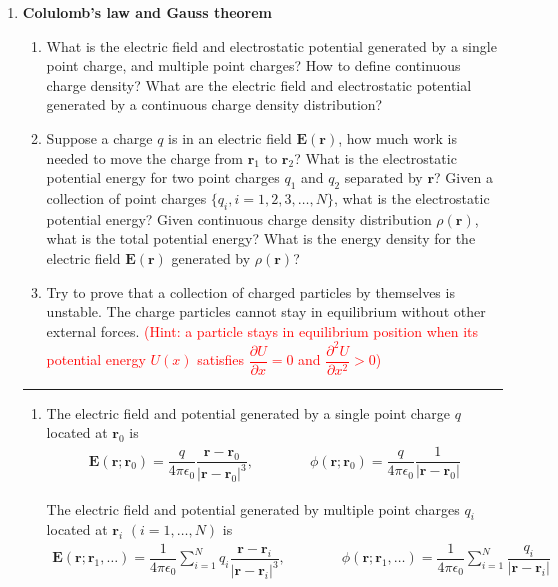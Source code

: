 \documentclass[a4paper,11pt]{article}
\begin{document}
\begin{enumerate}
    \item \textbf{Colulomb's law and Gauss theorem}
    \begin{enumerate}
        \item What is the electric field and electrostatic potential generated by a single point charge, and multiple point charges? How to define continuous charge density? What are the electric field and electrostatic potential generated by a continuous charge density distribution?
        \item Suppose a charge $q$ is in an electric field $\boldsymbol{E}(\boldsymbol{r})$, how much work is needed to move the charge from $\boldsymbol{r}_1$ to $\boldsymbol{r}_2$? What is the electrostatic potential energy for two point charges $q_1$ and $q_2$ separated by $\boldsymbol{r}$? Given a collection of point charges $\{q_i,i=1,2,3,\dots,N\}$, what is the electrostatic potential energy? Given continuous charge density distribution $\rho(\boldsymbol{r})$, what is the total potential energy? What is the energy density for the electric field $\boldsymbol{E}(\boldsymbol{r})$ generated by $\rho(\boldsymbol{r})$?
        \item Try to prove that a collection of charged particles by themselves is unstable. The charge particles cannot stay in equilibrium without other external forces. \textcolor{red}{(Hint: a particle stays in equilibrium position when its potential energy $U(x)$ satisfies $\dfrac{\partial U}{\partial x}= 0$ and $\dfrac{\partial^2 U}{\partial x^2}>0$)}
    \end{enumerate}
    \rule[0pt]{6cm}{0.05em}
    \begin{enumerate}
        \item The electric field and potential generated by a single point charge $q$ located at $\boldsymbol{r}_0$ is 
        \begin{eqnarray}
            \boldsymbol{E}(\boldsymbol{r};\boldsymbol{r}_0)=\dfrac{q}{4\pi\epsilon_0}\dfrac{\boldsymbol{r}-\boldsymbol{r}_0}{|\boldsymbol{r}-\boldsymbol{r}_0|^3},\quad\quad\quad\quad \phi(\boldsymbol{r};\boldsymbol{r}_0)=\dfrac{q}{4\pi\epsilon_0}\dfrac{1}{|\boldsymbol{r}-\boldsymbol{r}_0|}
        \end{eqnarray}

        The electric field and potential generated by multiple point charges $q_i$ located at $\boldsymbol{r}_i$ $(i=1,\dots,N)$ is 
        \begin{eqnarray}\label{eq1}
            \boldsymbol{E}(\boldsymbol{r};\boldsymbol{r}_1,\dots)=\dfrac{1}{4\pi\epsilon_0}\sum\limits^{N}_{i=1}q_i\dfrac{\boldsymbol{r}-\boldsymbol{r}_i}{|\boldsymbol{r}-\boldsymbol{r}_i|^3},\quad\quad\quad\quad \phi(\boldsymbol{r};\boldsymbol{r}_1,\dots)=\dfrac{1}{4\pi\epsilon_0}\sum\limits^{N}_{i=1}\dfrac{q_i}{|\boldsymbol{r}-\boldsymbol{r}_i|}
        \end{eqnarray}


\end{enumerate}
\end{enumerate}
\end{document}
